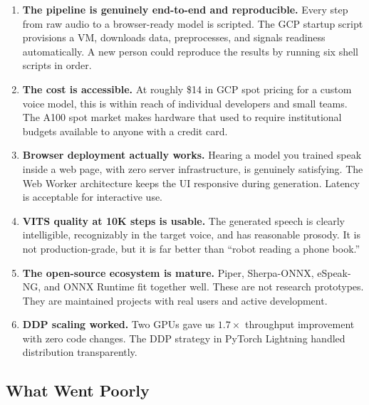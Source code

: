 \documentclass[10pt,a4paper,twocolumn]{article}
\begin{document}
\begin{enumerate}
    \item \textbf{The pipeline is genuinely end-to-end and reproducible.} Every step from raw audio to a browser-ready model is scripted. The GCP startup script provisions a VM, downloads data, preprocesses, and signals readiness automatically. A new person could reproduce the results by running six shell scripts in order.

    \item \textbf{The cost is accessible.} At roughly \$14 in GCP spot pricing for a custom voice model, this is within reach of individual developers and small teams. The A100 spot market makes hardware that used to require institutional budgets available to anyone with a credit card.

    \item \textbf{Browser deployment actually works.} Hearing a model you trained speak inside a web page, with zero server infrastructure, is genuinely satisfying. The Web Worker architecture keeps the UI responsive during generation. Latency is acceptable for interactive use.

    \item \textbf{VITS quality at 10K steps is usable.} The generated speech is clearly intelligible, recognizably in the target voice, and has reasonable prosody. It is not production-grade, but it is far better than ``robot reading a phone book.''

    \item \textbf{The open-source ecosystem is mature.} Piper, Sherpa-ONNX, eSpeak-NG, and ONNX Runtime fit together well. These are not research prototypes. They are maintained projects with real users and active development.

    \item \textbf{DDP scaling worked.} Two GPUs gave us $1.7\times$ throughput improvement with zero code changes. The DDP strategy in PyTorch Lightning handled distribution transparently.
\end{enumerate}

\subsection{What Went Poorly}
\end{document}

